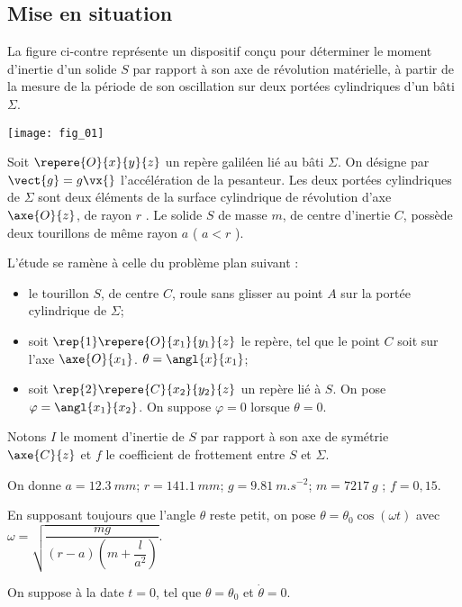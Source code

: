 \ifprof
\else
\begin{multicols}{2}
\fi


\section*{Mise en situation}
La figure ci-contre représente un dispositif conçu pour déterminer le moment d’inertie d’un solide $S$ par
rapport à son axe de révolution matérielle, à partir de la mesure de la période de son oscillation sur deux
portées cylindriques d’un bâti $\Sigma$.

\begin{center}
\texttt{[image: fig\_01]}
\end{center}
Soit $\repere{O}{x}{y}{z}$ un repère galiléen lié au bâti $\Sigma$. On désigne par $\vect{g}=g\vx{}$ l'accélération de la pesanteur. Les deux portées cylindriques de $\Sigma$ sont deux éléments de la surface cylindrique de révolution d’axe $\axe{O}{z}$, de rayon $r$ .
Le solide $S$ de masse $m$, de centre d’inertie $C$, possède deux tourillons de même rayon $a$ ( $a<r$ ).

L’étude se ramène à celle du problème plan suivant :
\begin{itemize}
\item le tourillon $S$, de centre $C$, roule sans glisser au point $A$ sur la portée cylindrique de $\Sigma$;
\item soit $\rep{1}\repere{O}{x_1}{y_1}{z}$ le repère, tel que le point $C$ soit sur l’axe $\axe{O}{x_1}$. $\theta=\angl{x}{x_1}$;
\item soit $\rep{2}\repere{C}{x_2}{y_2}{z}$ un repère lié à $S$. On pose $\varphi =\angl{x_1}{x_2}$. On suppose $\varphi=0$ lorsque $\theta=0$.
\end{itemize}
Notons $I$ le moment d’inertie de $S$ par rapport à son axe de symétrie $\axe{C}{z}$  et $f$ le coefficient de frottement entre $S$ et $\Sigma$.

On donne $a =\SI{12,3}{mm}$; $r =\SI{141,1}{mm}$; $ g = \SI{9,81}{m.s^{-2}}$; $m = \SI{7217}{g}$ ; $f = 0,15$.





En supposant toujours que l’angle $\theta$ reste petit, on pose $\theta=\theta_0\cos (\omega t)$ avec
$\omega = \sqrt{\dfrac{mg}{(r-a)\left(m+\dfrac{l}{a^2}\right)}}$.

On suppose à la date $t=0$, tel que $\theta = \theta_0$ et $\dot{\theta}=0$.


\ifprof
\else
\end{multicols}
\fi